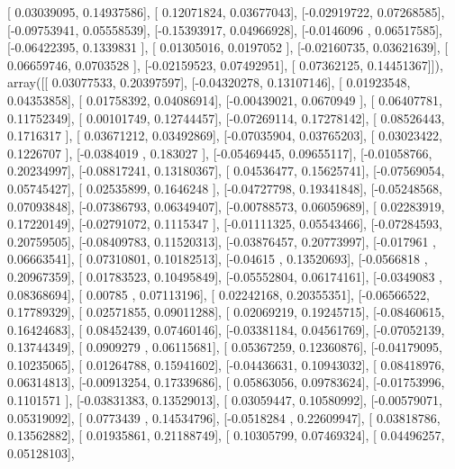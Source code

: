 \documentclass{article}
\begin{document}
       [ 0.03039095,  0.14937586],
       [ 0.12071824,  0.03677043],
       [-0.02919722,  0.07268585],
       [-0.09753941,  0.05558539],
       [-0.15393917,  0.04966928],
       [-0.0146096 ,  0.06517585],
       [-0.06422395,  0.1339831 ],
       [ 0.01305016,  0.0197052 ],
       [-0.02160735,  0.03621639],
       [ 0.06659746,  0.0703528 ],
       [-0.02159523,  0.07492951],
       [ 0.07362125,  0.14451367]]), array([[ 0.03077533,  0.20397597],
       [-0.04320278,  0.13107146],
       [ 0.01923548,  0.04353858],
       [ 0.01758392,  0.04086914],
       [-0.00439021,  0.0670949 ],
       [ 0.06407781,  0.11752349],
       [ 0.00101749,  0.12744457],
       [-0.07269114,  0.17278142],
       [ 0.08526443,  0.1716317 ],
       [ 0.03671212,  0.03492869],
       [-0.07035904,  0.03765203],
       [ 0.03023422,  0.1226707 ],
       [-0.0384019 ,  0.183027  ],
       [-0.05469445,  0.09655117],
       [-0.01058766,  0.20234997],
       [-0.08817241,  0.13180367],
       [ 0.04536477,  0.15625741],
       [-0.07569054,  0.05745427],
       [ 0.02535899,  0.1646248 ],
       [-0.04727798,  0.19341848],
       [-0.05248568,  0.07093848],
       [-0.07386793,  0.06349407],
       [-0.00788573,  0.06059689],
       [ 0.02283919,  0.17220149],
       [-0.02791072,  0.1115347 ],
       [-0.01111325,  0.05543466],
       [-0.07284593,  0.20759505],
       [-0.08409783,  0.11520313],
       [-0.03876457,  0.20773997],
       [-0.017961  ,  0.06663541],
       [ 0.07310801,  0.10182513],
       [-0.04615   ,  0.13520693],
       [-0.0566818 ,  0.20967359],
       [ 0.01783523,  0.10495849],
       [-0.05552804,  0.06174161],
       [-0.0349083 ,  0.08368694],
       [ 0.00785   ,  0.07113196],
       [ 0.02242168,  0.20355351],
       [-0.06566522,  0.17789329],
       [ 0.02571855,  0.09011288],
       [ 0.02069219,  0.19245715],
       [-0.08460615,  0.16424683],
       [ 0.08452439,  0.07460146],
       [-0.03381184,  0.04561769],
       [-0.07052139,  0.13744349],
       [ 0.0909279 ,  0.06115681],
       [ 0.05367259,  0.12360876],
       [-0.04179095,  0.10235065],
       [ 0.01264788,  0.15941602],
       [-0.04436631,  0.10943032],
       [ 0.08418976,  0.06314813],
       [-0.00913254,  0.17339686],
       [ 0.05863056,  0.09783624],
       [-0.01753996,  0.1101571 ],
       [-0.03831383,  0.13529013],
       [ 0.03059447,  0.10580992],
       [-0.00579071,  0.05319092],
       [ 0.0773439 ,  0.14534796],
       [-0.0518284 ,  0.22609947],
       [ 0.03818786,  0.13562882],
       [ 0.01935861,  0.21188749],
       [ 0.10305799,  0.07469324],
       [ 0.04496257,  0.05128103],
\end{document}

